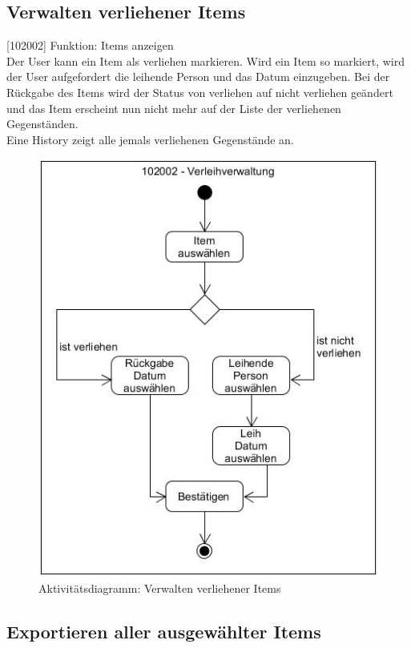 \subsection{Verwalten verliehener Items}

[102002] Funktion: Items anzeigen\\

Der User kann ein Item als verliehen markieren. Wird ein Item so markiert, wird der User aufgefordert die leihende Person und das Datum einzugeben. Bei der Rückgabe des Items wird der Status von verliehen auf nicht verliehen geändert und das Item erscheint nun nicht mehr auf der Liste der verliehenen Gegenständen.\\
Eine History zeigt alle jemals verliehenen Gegenstände an.

\begin{figure}[htbp]
	\centering
	\includegraphics[scale=0.6]{pic/102002}
	\caption{Aktivitätsdiagramm: Verwalten verliehener Items}
\end{figure}

\subsection{Exportieren aller ausgewählter Items}

